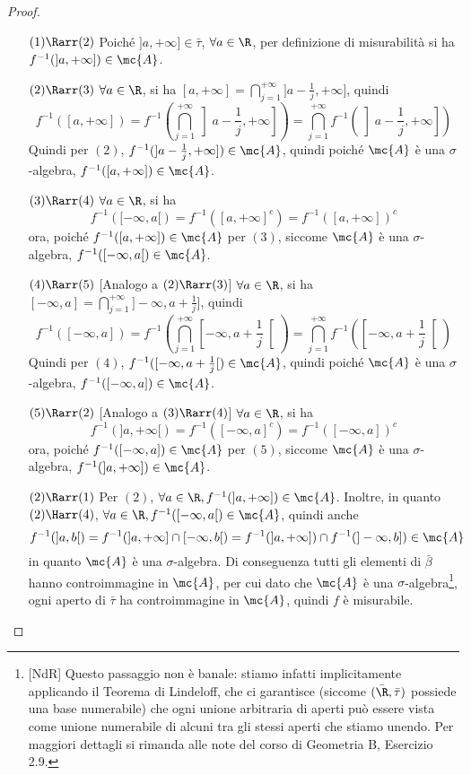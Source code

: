 \begin{proof}~
    \begin{itemize}[leftmargin = 45pt]
        \item[$(1)\Rarr (2)$] Poiché $]a,+\infty]\in \bar\tau$, $\forall a\in\R$, per definizione di misurabilità si ha  $f^{-1}(]a,+\infty])\in \mc{A}$.
        \item[$(2)\Rarr (3)$] $\forall a \in \R$, si ha $[a,+\infty]=\bigcap_{j=1}^{+\infty}]a-\frac{1}{j},+\infty]$, quindi 
        \[f^{-1}([a,+\infty])=f^{-1}\left( \bigcap_{j=1}^{+\infty}\left]a-\frac{1}{j},+\infty \right]\right)=\bigcap_{j=1}^{+\infty}f^{-1}\left( \left]a-\frac{1}{j},+\infty \right]\right)\]
        Quindi per $(2)$, $f^{-1}(]a-\frac{1}{j},+\infty])\in \mc{A}$, quindi poiché $\mc{A}$ è una $\sigma$-algebra, $f^{-1}([a,+\infty])\in \mc{A}$.
        \item[$(3)\Rarr (4)$]$\forall a \in \R$, si ha 
            \[f^{-1}([-\infty,a[)=f^{-1}([a,+\infty]^c)=f^{-1}([a,+\infty])^c\]
            ora, poiché $f^{-1}([a,+\infty])\in \mc{A}$ per $(3)$, siccome $\mc{A}$ è una $\sigma$-algebra, $f^{-1}([-\infty,a[)\in \mc{A}$.
        \item[$(4)\Rarr (5)$] [Analogo a $(2)\Rarr(3)$] $\forall a \in \R$, si ha $[-\infty,a]=\bigcap_{j=1}^{+\infty}]-\infty,a+\frac{1}{j}]$, quindi 
        \[f^{-1}([-\infty,a])=f^{-1}\left( \bigcap_{j=1}^{+\infty}\left[-\infty,a+\frac{1}{j} \right[\right)=\bigcap_{j=1}^{+\infty}f^{-1}\left( \left[-\infty, a+\frac{1}{j} \right[\right)\]
        Quindi per $(4)$, $f^{-1}([-\infty,a+\frac{1}{j}[)\in \mc{A}$, quindi poiché $\mc{A}$ è una $\sigma$-algebra, $f^{-1}([-\infty,a])\in \mc{A}$.
        \item[$(5)\Rarr (2)$] [Analogo a $(3)\Rarr(4)$] $\forall a \in \R$, si ha 
        \[f^{-1}(]a,+\infty[)=f^{-1}([-\infty,a]^c)=f^{-1}([-\infty,a])^c\]
        ora, poiché $f^{-1}([-\infty,a])\in \mc{A}$ per $(5)$, siccome $\mc{A}$ è una $\sigma$-algebra, $f^{-1}(]a,+\infty])\in \mc{A}$.
        \item[$(2)\Rarr (1)$] Per $(2)$, $\forall a\in \R, f^{-1}(]a,+\infty])\in \mc{A}$. Inoltre, in quanto $(2)\Harr (4)$,  $\forall a \in \R, f^{-1}([-\infty,a[)\in \mc{A}$, quindi anche 
            \[f^{-1}(]a,b[)=f^{-1}(]a,+\infty]\cap[-\infty,b[)=f^{-1}(]a,+\infty])\cap f^{-1}(]-\infty,b])\in \mc{A}\]
        in quanto $\mc{A}$ è una $\sigma$-algebra. Di conseguenza tutti gli elementi di $\bar \beta$ hanno controimmagine in $\mc{A}$, per cui dato che $\mc{A}$ è una $\sigma$-algebra\footnote{[NdR] Questo passaggio non è banale: stiamo infatti implicitamente applicando il Teorema di Lindeloff, che ci garantisce (siccome $(\bar\R,\bar\tau)$ possiede una base numerabile) che ogni unione arbitraria di aperti può essere vista come unione numerabile di alcuni tra gli stessi aperti che stiamo unendo. Per maggiori dettagli si rimanda alle note del corso di Geometria B, Esercizio 2.9.}, ogni aperto di $\bar\tau$ ha controimmagine in $\mc{A}$, quindi $f$ è misurabile. 
    \end{itemize} 
\end{proof}
